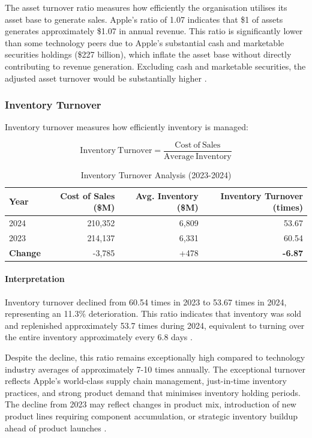\documentclass[12pt,a4paper]{article}
\begin{document}
The asset turnover ratio measures how efficiently the organisation utilises its asset base to generate sales. Apple's ratio of 1.07 indicates that \$1 of assets generates approximately \$1.07 in annual revenue. This ratio is significantly lower than some technology peers due to Apple's substantial cash and marketable securities holdings (\$227 billion), which inflate the asset base without directly contributing to revenue generation. Excluding cash and marketable securities, the adjusted asset turnover would be substantially higher \citep{kieso2023}.

\subsubsection{Inventory Turnover}

Inventory turnover measures how efficiently inventory is managed:

\begin{equation}
\mathrm{Inventory\ Turnover} = \frac{\mathrm{Cost\ of\ Sales}}{\mathrm{Average\ Inventory}}
\end{equation}

\begin{table}[H]
\centering
\caption{Inventory Turnover Analysis (2023-2024)}
\label{tab:inventory_turnover}
\begin{tabular}{lrrr}
\toprule
\textbf{Year} & \textbf{Cost of Sales (\$M)} & \textbf{Avg. Inventory (\$M)} & \textbf{Inventory Turnover (times)} \\
\midrule
2024 & 210,352 & 6,809 & 53.67 \\
2023 & 214,137 & 6,331 & 60.54 \\
\textbf{Change} & -3,785 & +478 & \textbf{-6.87} \\
\bottomrule
\end{tabular}
\end{table}

\paragraph{Interpretation}

Inventory turnover declined from 60.54 times in 2023 to 53.67 times in 2024, representing an 11.3\% deterioration. This ratio indicates that inventory was sold and replenished approximately 53.7 times during 2024, equivalent to turning over the entire inventory approximately every 6.8 days \citep{apple202410k}.

Despite the decline, this ratio remains exceptionally high compared to technology industry averages of approximately 7-10 times annually. The exceptional turnover reflects Apple's world-class supply chain management, just-in-time inventory practices, and strong product demand that minimises inventory holding periods. The decline from 2023 may reflect changes in product mix, introduction of new product lines requiring component accumulation, or strategic inventory buildup ahead of product launches \citep{unleashed2024}.
\end{document}
